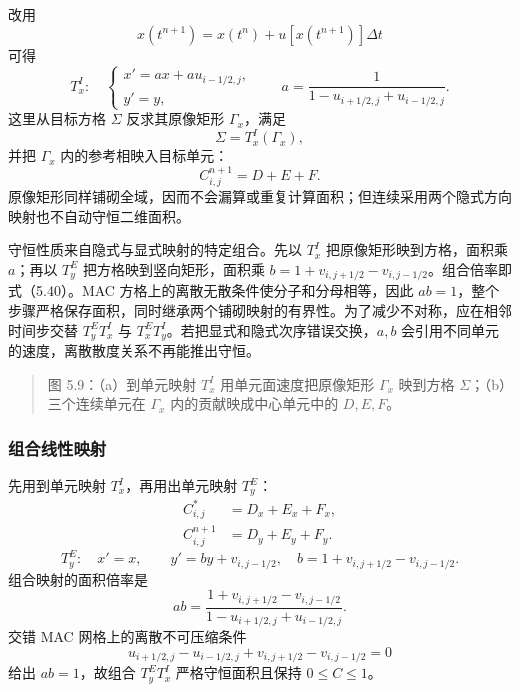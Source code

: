 \documentclass[11pt,a4paper,openany,fontset=none]{ctexbook}
\begin{document}
改用
\begin{equation}
x(t^{n+1})=x(t^n)+u[x(t^{n+1})]\Delta t
\tag{5.33}
\end{equation}
可得
\begin{equation}
T_x^I:\quad
\begin{cases}
x'=ax+au_{i-1/2,j},\\
y'=y,
\end{cases}
\qquad a=\frac{1}{1-u_{i+1/2,j}+u_{i-1/2,j}}.
\tag{5.34}
\end{equation}
这里从目标方格 $\Sigma$ 反求其原像矩形 $\Gamma_x$，满足
\begin{equation}
\Sigma=T_x^I(\Gamma_x),
\tag{5.35}
\end{equation}
并把 $\Gamma_x$ 内的参考相映入目标单元：
\begin{equation}
C_{i,j}^{n+1}=D+E+F.
\tag{5.36}
\end{equation}
原像矩形同样铺砌全域，因而不会漏算或重复计算面积；但连续采用两个隐式方向映射也不自动守恒二维面积。

守恒性质来自隐式与显式映射的特定组合。先以 $T_x^I$ 把原像矩形映到方格，面积乘 $a$；再以 $T_y^E$ 把方格映到竖向矩形，面积乘 $b=1+v_{i,j+1/2}-v_{i,j-1/2}$。组合倍率即式（5.40）。MAC 方格上的离散无散条件使分子和分母相等，因此 $ab=1$，整个步骤严格保存面积，同时继承两个铺砌映射的有界性。为了减少不对称，应在相邻时间步交替 $T_y^ET_x^I$ 与 $T_x^ET_y^I$。若把显式和隐式次序错误交换，$a,b$ 会引用不同单元的速度，离散散度关系不再能推出守恒。

\begin{quote}\small 图 5.9：（a）到单元映射 $T_x^I$ 用单元面速度把原像矩形 $\Gamma_x$ 映到方格 $\Sigma$；（b）三个连续单元在 $\Gamma_x$ 内的贡献映成中心单元中的 $D,E,F$。\end{quote}
\subsubsection{组合线性映射}

先用到单元映射 $T_x^I$，再用出单元映射 $T_y^E$：
\begin{align}
C^*_{i,j}&=D_x+E_x+F_x,\tag{5.38}\\
C^{n+1}_{i,j}&=D_y+E_y+F_y.\tag{5.39}
\end{align}
\begin{equation}
T_y^E:\quad x'=x,\qquad y'=by+v_{i,j-1/2},
\quad b=1+v_{i,j+1/2}-v_{i,j-1/2}.
\tag{5.37}
\end{equation}
组合映射的面积倍率是
\begin{equation}
ab=\frac{1+v_{i,j+1/2}-v_{i,j-1/2}}
{1-u_{i+1/2,j}+u_{i-1/2,j}}.
\tag{5.40}
\end{equation}
交错 MAC 网格上的离散不可压缩条件
\begin{equation}
u_{i+1/2,j}-u_{i-1/2,j}+v_{i,j+1/2}-v_{i,j-1/2}=0
\tag{5.41}
\end{equation}
给出 $ab=1$，故组合 $T_y^ET_x^I$ 严格守恒面积且保持 $0\leq C\leq1$。
\end{document}
